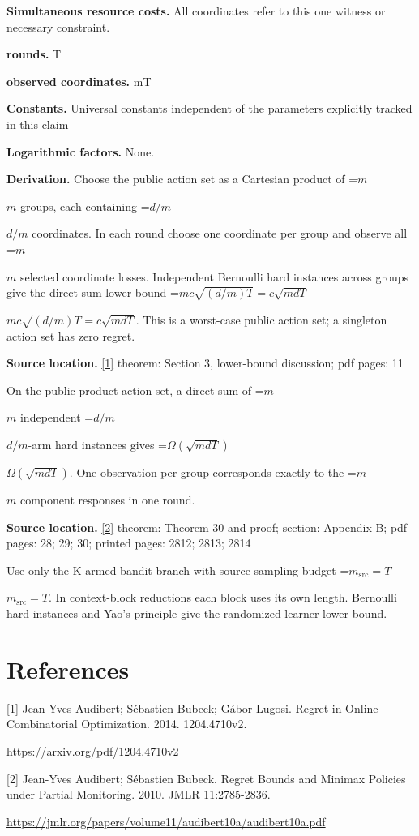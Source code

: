 \documentclass[10pt,a4paper]{article}
\newcommand{\AtlasMath}[1]{\par\begingroup\centering\setbox0=\hbox{$\displaystyle #1$}\ifdim\wd0>1.4\linewidth\typeout{ATLAS WIDE FORMULA: \the\wd0}\fi\ifdim\wd0>\linewidth\resizebox{\linewidth}{!}{\box0}\else\box0\fi\par\endgroup}
\newcommand{\AtlasInlineMath}[1]{\begingroup\setbox0=\hbox{$#1$}\ifdim\wd0>.4\linewidth\endgroup\AtlasMath{#1}\else\endgroup$#1$\fi}
\begin{document}
\textbf{Simultaneous resource costs.} All coordinates refer to this one witness or necessary constraint.

\textbf{rounds.} T

\textbf{observed coordinates.} mT

\textbf{Constants.} Universal constants independent of the parameters explicitly tracked in this claim

\textbf{Logarithmic factors.} None.

\textbf{Derivation.} Choose the public action set as a Cartesian product of \AtlasInlineMath{m} groups, each containing \AtlasInlineMath{d/m} coordinates. In each round choose one coordinate per group and observe all \AtlasInlineMath{m} selected coordinate losses. Independent Bernoulli hard instances across groups give the direct-sum lower bound \AtlasInlineMath{mc\sqrt{(d/m)T}=c\sqrt{mdT}}. This is a worst-case public action set; a singleton action set has zero regret.

\textbf{Source location.} \href{https://arxiv.org/pdf/1204.4710v2}{[1]} theorem: Section 3, lower-bound discussion; pdf pages: 11

On the public product action set, a direct sum of \AtlasInlineMath{m} independent \AtlasInlineMath{d/m}-arm hard instances gives \AtlasInlineMath{\Omega(\sqrt{mdT})}. One observation per group corresponds exactly to the \AtlasInlineMath{m} component responses in one round.

\textbf{Source location.} \href{https://jmlr.org/papers/volume11/audibert10a/audibert10a.pdf}{[2]} theorem: Theorem 30 and proof; section: Appendix B; pdf pages: 28; 29; 30; printed pages: 2812; 2813; 2814

Use only the K-armed bandit branch with source sampling budget \AtlasInlineMath{m_{\mathrm{src}}=T}. In context-block reductions each block uses its own length. Bernoulli hard instances and Yao's principle give the randomized-learner lower bound.

\section{References}
[1] Jean-Yves Audibert; Sébastien Bubeck; Gábor Lugosi. Regret in Online Combinatorial Optimization. 2014. 1204.4710v2.

\url{https://arxiv.org/pdf/1204.4710v2}

[2] Jean-Yves Audibert; Sébastien Bubeck. Regret Bounds and Minimax Policies under Partial Monitoring. 2010. JMLR 11:2785-2836.

\url{https://jmlr.org/papers/volume11/audibert10a/audibert10a.pdf}
\end{document}
